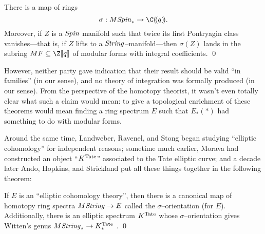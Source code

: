 \begin{theorem}\label{OchanineWittenTheorem}
There is a map of rings \[\sigma: M\Spin_* \to \C(\!(q)\!).\]  Moreover, if $Z$ is a $\mathit{Spin}$ manifold such that twice its first Pontryagin class vanishes---that is, if $Z$ lifts to a $\mathit{String}$--manifold---then $\sigma(Z)$ lands in the subring $MF \subseteq \Z\ps{q}$ of modular forms with integral coefficients. \qed
\end{theorem}

\noindent However, neither party gave indication that their result should be valid ``in families'' (in our sense), and no theory of integration was formally produced (in our sense).  From the perspective of the homotopy theorist, it wasn't even totally clear what such a claim would mean: to give a topological enrichment of these theorems would mean finding a ring spectrum $E$ such that $E_*(*)$ had something to do with modular forms.

Around the same time, Landweber, Ravenel, and Stong began studying ``elliptic cohomology'' for independent reasons; sometime much earlier, Morava had constructed an object ``$K^{\mathrm{Tate}}$'' associated to the Tate elliptic curve; and a decade later Ando, Hopkins, and Strickland put all these things together in the following theorem:

\begin{theorem}
If $E$ is an ``elliptic cohomology theory'', then there is a canonical map of homotopy ring spectra $M\mathit{String} \to E$ called the $\sigma$--orientation (for $E$).  Additionally, there is an elliptic spectrum $K^{\mathrm{Tate}}$ whose $\sigma$--orientation gives Witten's genus $M\mathit{String}_* \to K^{\mathrm{Tate}}_*$ . \qed
\end{theorem}


